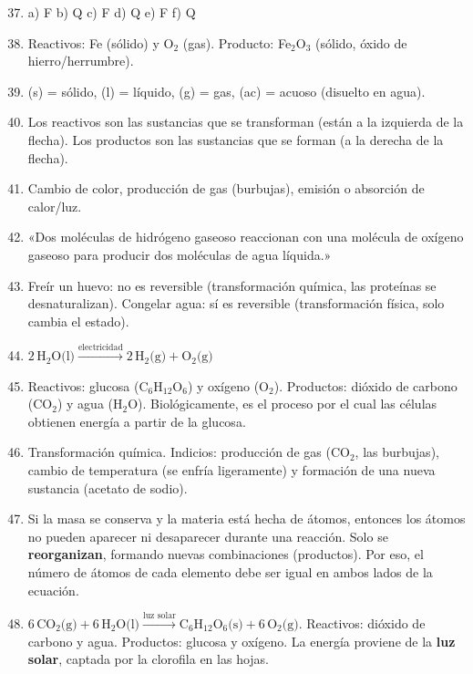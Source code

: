 \documentclass[12pt, a4paper]{article}
\begin{document}
\begin{enumerate}[leftmargin=*, label=\textbf{\arabic*.}]
  \setcounter{enumi}{36}
  \item a) F \quad b) Q \quad c) F \quad d) Q \quad e) F \quad f) Q

  \item Reactivos: Fe (sólido) y O$_2$ (gas). Producto: Fe$_2$O$_3$ (sólido, óxido de hierro/herrumbre).

  \item (s) = sólido, (l) = líquido, (g) = gas, (ac) = acuoso (disuelto en agua).

  \item Los reactivos son las sustancias que se transforman (están a la izquierda de la flecha). Los productos son las sustancias que se forman (a la derecha de la flecha).

  \item Cambio de color, producción de gas (burbujas), emisión o absorción de calor/luz.

  \item «Dos moléculas de hidrógeno gaseoso reaccionan con una molécula de oxígeno gaseoso para producir dos moléculas de agua líquida.»

  \item Freír un huevo: no es reversible (transformación química, las proteínas se desnaturalizan). Congelar agua: sí es reversible (transformación física, solo cambia el estado).

  \item $2\,\text{H}_2\text{O(l)} \xrightarrow{\text{electricidad}} 2\,\text{H}_2\text{(g)} + \text{O}_2\text{(g)}$

  \item Reactivos: glucosa (C$_6$H$_{12}$O$_6$) y oxígeno (O$_2$). Productos: dióxido de carbono (CO$_2$) y agua (H$_2$O). Biológicamente, es el proceso por el cual las células obtienen energía a partir de la glucosa.

  \item Transformación química. Indicios: producción de gas (CO$_2$, las burbujas), cambio de temperatura (se enfría ligeramente) y formación de una nueva sustancia (acetato de sodio).

  \item Si la masa se conserva y la materia está hecha de átomos, entonces los átomos no pueden aparecer ni desaparecer durante una reacción. Solo se \textbf{reorganizan}, formando nuevas combinaciones (productos). Por eso, el número de átomos de cada elemento debe ser igual en ambos lados de la ecuación.

  \item $6\,\text{CO}_2\text{(g)} + 6\,\text{H}_2\text{O(l)} \xrightarrow{\text{luz solar}} \text{C}_6\text{H}_{12}\text{O}_6\text{(s)} + 6\,\text{O}_2\text{(g)}$. Reactivos: dióxido de carbono y agua. Productos: glucosa y oxígeno. La energía proviene de la \textbf{luz solar}, captada por la clorofila en las hojas.
\end{enumerate}
\end{document}
